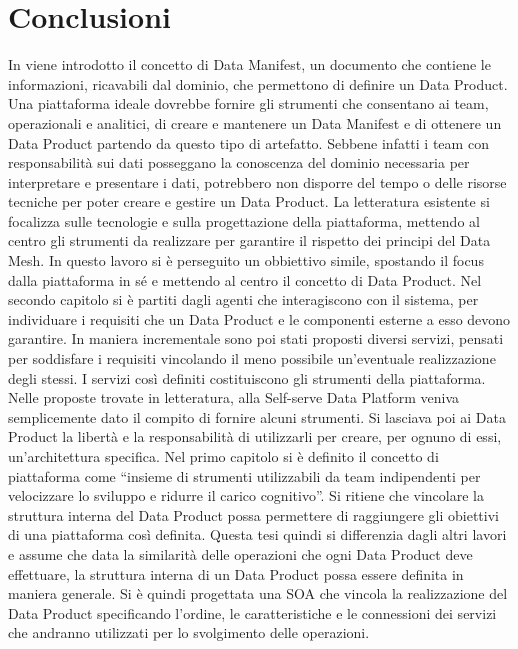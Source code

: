 \documentclass[a4paper,12pt]{report}
\begin{document}
\chapter*{Conclusioni}
In \cite{dehghani_data_2022} viene introdotto il concetto di Data Manifest, un documento che contiene le informazioni, ricavabili dal dominio, che permettono di definire un Data Product.
Una piattaforma ideale dovrebbe fornire gli strumenti che consentano ai team, operazionali e analitici, di creare e mantenere un Data Manifest e di ottenere un Data Product partendo da questo tipo di artefatto.
Sebbene infatti i team con responsabilità sui dati posseggano la conoscenza del dominio necessaria per interpretare e presentare i dati, potrebbero non disporre del tempo o delle risorse tecniche per poter creare e gestire un Data Product. 
La letteratura esistente si focalizza sulle tecnologie e sulla progettazione della piattaforma, mettendo al centro gli strumenti da realizzare per garantire il rispetto dei principi del Data Mesh.
In questo lavoro si è perseguito un obbiettivo simile, spostando il focus dalla piattaforma in sé e mettendo al centro il concetto di Data Product.
Nel secondo capitolo si è partiti dagli agenti che interagiscono con il sistema, per individuare i requisiti che un Data Product e le componenti esterne a esso devono garantire.
In maniera incrementale sono poi stati proposti diversi servizi, pensati per soddisfare i requisiti vincolando il meno possibile un'eventuale realizzazione degli stessi.
I servizi così definiti costituiscono gli strumenti della piattaforma.
Nelle proposte trovate in letteratura, alla Self-serve Data Platform veniva semplicemente dato il compito di fornire alcuni strumenti.
Si lasciava poi ai Data Product la libertà e la responsabilità di utilizzarli per creare, per ognuno di essi, un'architettura specifica. 
Nel primo capitolo si è definito il concetto di piattaforma come ``insieme di strumenti utilizzabili da team indipendenti per velocizzare lo sviluppo e ridurre il carico cognitivo''.
Si ritiene che vincolare la struttura interna del Data Product possa permettere di raggiungere gli obiettivi di una piattaforma così definita.
Questa tesi quindi si differenzia dagli altri lavori e assume che data la similarità delle operazioni che ogni Data Product deve effettuare, la struttura interna di un Data Product possa essere definita in maniera generale.
Si è quindi progettata una SOA che vincola la realizzazione del Data Product specificando l'ordine, le caratteristiche e le connessioni dei servizi che andranno utilizzati per lo svolgimento delle operazioni.
\end{document}
